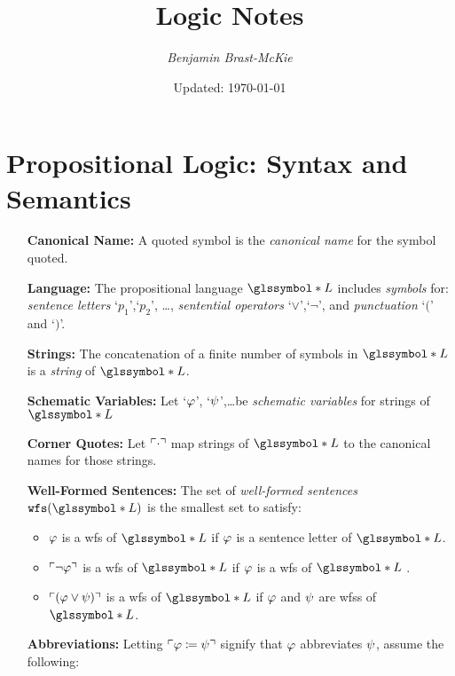\documentclass[a4paper, 11pt]{article} %
\title{\textbf{Logic Notes}} %
\author{\em Benjamin Brast-McKie} %
\date{Updated: \today} %
\makeatletter
\newcommand{\g}{\glssymbol*}%
\renewcommand{\maketitle}{ %
\begin{flushright} %
{\@date\hfill \LARGE\@title} %

\vspace{5pt} %

{\@author} %

\end{flushright}
}
\makeatother
\begin{document}
\maketitle %
\thispagestyle{empty}



\section*{\sc Propositional Logic: Syntax and Semantics}

\begin{enumerate}[leftmargin=1.2in,labelsep=.15in] %
  \item[\bf Canonical Name:] A quoted symbol is the \textit{canonical name} for the symbol quoted.
  \item[\bf Language:] The propositional language $\g{L}$ includes \textit{symbols} for: \textit{sentence letters} `$p_1$',`$p_2$', \dots, \textit{sentential operators} `$\vee$',`$\neg$', and \textit{punctuation} `$($' and `$)$'.
  \item[\bf Strings:] The concatenation of a finite number of symbols in $\g{L}$ is a \textit{string} of $\g{L}$.
  \item[\bf Schematic Variables:] Let `$\varphi$', `$\psi$',\ldots be \textit{schematic variables} for strings of $\g{L}$
  \item[\bf Corner Quotes:] Let $\ulcorner\cdot\urcorner$ map strings of $\g{L}$ to the canonical names for those strings.
  \item[\bf Well-Formed Sentences:] The set of \textit{well-formed sentences} $\wfs{\g{L}}$ is the smallest set to satisfy:
    \begin{itemize}\small
      \item $\varphi$ is a wfs of $\g{L}$ if $\varphi$ is a sentence letter of $\g{L}$. 
      \item $\ulcorner\neg \varphi\urcorner$ is a wfs of $\g{L}$ if $\varphi$ is a wfs of $\g{L}$ .
      \item $\ulcorner(\varphi\vee \psi)\urcorner$ is a wfs of $\g{L}$ if $\varphi$ and $\psi$ are wfss of $\g{L}$.
    \end{itemize}
  \item[\bf Abbreviations:] Letting $\ulcorner\varphi \coloneq \psi\urcorner$ signify that $\varphi$ abbreviates $\psi$, assume the following:

\end{enumerate}
\end{document}
